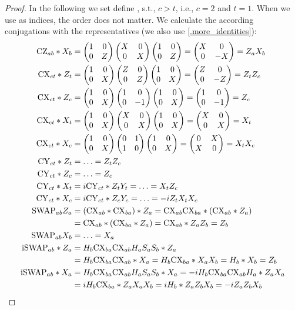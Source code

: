 \documentclass[a4paper,english]{scrartcl}
\begin{document}
\begin{proof}
In the following we set define \en[c, t], s.t., $c > t$, i.e., $c=2$ and $t=1$. When we
use \en[a, b] as indices, the order does not matter. We
calculate the according conjugations with the representatives (we also use
\cref{.more_identities}):
\begin{align}
  \cz_{ab}*X_b &= \matp{1&0\\0&Z} \matp{X&0\\0&X} \matp{1&0\\0&Z} =
  \matp{X&0\\0&-X} = Z_aX_b\\
  \cx_{ct}*Z_t &= \matp{1&0\\0&X} \matp{Z&0\\0&Z} \matp{1&0\\0&X} =
  \matp{Z&0\\0&-Z} = Z_tZ_c\\
  \cx_{ct}*Z_c &= \matp{1&0\\0&X} \matp{1&0\\0&-1} \matp{1&0\\0&X} =
  \matp{1&0\\0&-1} = Z_c\\
  \cx_{ct}*X_t &= \matp{1&0\\0&X} \matp{X&0\\0&X} \matp{1&0\\0&X} =
  \matp{X&0\\0&X} = X_t\\
  \cx_{ct}*X_c &= \matp{1&0\\0&X} \matp{0&1\\1&0} \matp{1&0\\0&X} =
  \matp{0&X\\X&0} = X_tX_c\\
  \cy_{ct}*Z_t &= \ldots = Z_tZ_c\\
  \cy_{ct}*Z_c &= \ldots = Z_c\\
  \cy_{ct}*X_t &= i\cy_{ct}*Z_tY_t = \ldots = X_tZ_c\\
  \cy_{ct}*X_c &= i\cy_{ct}*Z_cY_c = \ldots = -iZ_tX_tX_c\\
  \Swap_{ab}Z_a &= (\cx_{ab} * \cx_{ba}) * Z_a = \cx_{ab} \cx_{ba} * (\cx_{ab} * Z_a)\\
  &= \cx_{ab} * (\cx_{ba} * Z_a) = \cx_{ab} * Z_a Z_b = Z_b\\
  \Swap_{ab}X_b &= \ldots = X_a\\
  \iSwap_{ab} * Z_a &= H_b \cx_{ba} \cx_{ab} H_a S_a S_b * Z_a\\
  &= H_b \cx_{ba} \cx_{ab} * X_a = H_b \cx_{ba} * X_a X_b = H_b * X_b = Z_b\\
  \iSwap_{ab} * X_a &= H_b \cx_{ba} \cx_{ab} H_a S_a S_b * X_a = -iH_b \cx_{ba} \cx_{ab}
  H_a * Z_aX_a\\
  &= iH_b \cx_{ba} * Z_aX_aX_b = iH_b * Z_aZ_bX_b = -i Z_aZ_bX_b
\end{align}
\end{proof}
\end{document}
